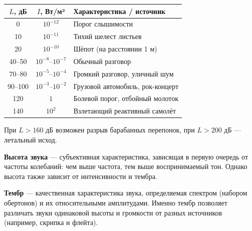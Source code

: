\begin{property}
\begin{center}
\begin{tabular}{|c|c|l|}
\hline
$L$, дБ & $I$, Вт/м² & Характеристика / источник \\
\hline
0 & $10^{-12}$ & Порог слышимости \\
10 & $10^{-11}$ & Тихий шелест листьев \\
20 & $10^{-10}$ & Шёпот (на расстоянии 1 м) \\
40--50 & $10^{-8}$--$10^{-7}$ & Обычный разговор \\
70--80 & $10^{-5}$--$10^{-4}$ & Громкий разговор, уличный шум \\
90--100 & $10^{-3}$--$10^{-2}$ & Грузовой автомобиль, рок-концерт \\
120 & $1$ & Болевой порог, отбойный молоток \\
140 & $10^2$ & Взлетающий реактивный самолёт \\
\hline
\end{tabular}
\end{center}
При $L > 160$ дБ возможен разрыв барабанных перепонок, при $L > 200$ дБ --- летальный исход.
\end{property}

\begin{remark}
\textbf{Высота звука} --- субъективная характеристика, зависящая в первую очередь от частоты колебаний: чем выше частота, тем выше воспринимаемый тон. Однако высота также зависит от интенсивности и тембра.
\par\noindent\textbf{Тембр} --- качественная характеристика звука, определяемая спектром (набором обертонов) и их относительными амплитудами. Именно тембр позволяет различать звуки одинаковой высоты и громкости от разных источников (например, скрипка и флейта).
\end{remark}
